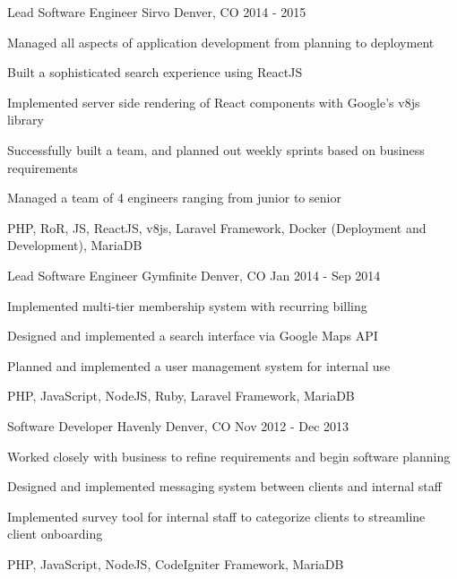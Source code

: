\begin{cventries}
{\begin{cvitems}
      \end{cvitems}
    }
  \cventry
    {Lead Software Engineer}
    {Sirvo}
    {Denver, CO}
    {2014 - 2015}
    {
      \begin{cvitems}
        \item {Managed all aspects of application development from planning to deployment}
        \item {Built a sophisticated search experience using ReactJS}
        \item {Implemented server side rendering of React components with Google’s v8js library}
        \item {Successfully built a team, and planned out weekly sprints based on business requirements}
        \item {Managed a team of 4 engineers ranging from junior to senior}
        \item {PHP, RoR, JS, ReactJS, v8js, Laravel Framework, Docker (Deployment and Development), MariaDB}
      \end{cvitems}
    }
  \cventry
    {Lead Software Engineer}
    {Gymfinite}
    {Denver, CO}
    {Jan 2014 - Sep 2014}
    {
      \begin{cvitems}
        \item {Implemented multi-tier membership system with recurring billing}
        \item {Designed and implemented a search interface via Google Maps API}
        \item {Planned and implemented a user management system for internal use}
        \item {PHP, JavaScript, NodeJS, Ruby, Laravel Framework, MariaDB}
      \end{cvitems}
    }
  \cventry
    {Software Developer}
    {Havenly}
    {Denver, CO}
    {Nov 2012 - Dec 2013}
    {
      \begin{cvitems}
        \item {Worked closely with business to refine requirements and begin software planning}
        \item {Designed and implemented messaging system between clients and internal staff}
        \item {Implemented survey tool for internal staff to categorize clients to streamline client onboarding}
        \item {PHP, JavaScript, NodeJS, CodeIgniter Framework, MariaDB}
      \end{cvitems}
    }
\end{cventries}
